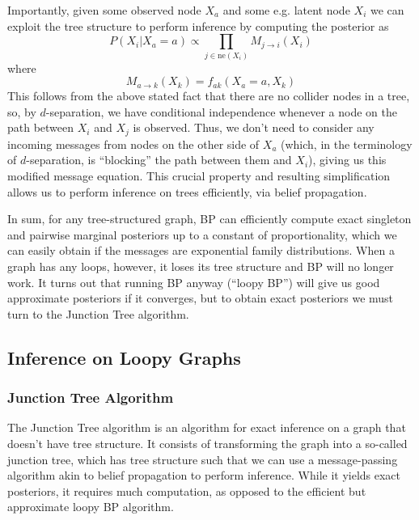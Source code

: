\documentclass[a4paper]{article}
\begin{document}
Importantly, given some observed node $X_a$ and some e.g. latent node $X_i$ we can exploit the tree structure to perform inference by computing the posterior as
\[ P(X_i|X_a = a) \propto \prod_{j\in\textrm{ne}(X_i)} M_{j\rightarrow i}(X_i) \]
where
\[ M_{a\rightarrow k}(X_k) = f_{ak}(X_a = a,X_k) \]
This follows from the above stated fact that there are no collider nodes in a tree, so, by $d$-separation, we have conditional independence whenever a node on the path between $X_i$ and $X_j$ is observed. Thus, we don't need to consider any incoming messages from nodes on the other side of $X_a$ (which, in the terminology of $d$-separation, is ``blocking'' the path between them and $X_i$), giving us this modified message equation. This crucial property and resulting simplification allows us to perform inference on trees efficiently, via belief propagation. 

In sum, for any tree-structured graph, BP can efficiently compute exact singleton and pairwise marginal posteriors up to a constant of proportionality, which we can easily obtain if the messages are exponential family distributions. When a graph has any loops, however, it loses its tree structure and BP will no longer work. It turns out that running BP anyway (``loopy BP'') will give us good approximate posteriors if it converges, but to obtain exact posteriors we must turn to the Junction Tree algorithm.

\subsection{Inference on Loopy Graphs}
\subsubsection{Junction Tree Algorithm}
The Junction Tree algorithm is an algorithm for exact inference on a graph that doesn't have tree structure. It consists of transforming the graph into a so-called junction tree, which has tree structure such that we can use a message-passing algorithm akin to belief propagation to perform inference. While it yields exact posteriors, it requires much computation, as opposed to the efficient but approximate loopy BP algorithm.
\end{document}
